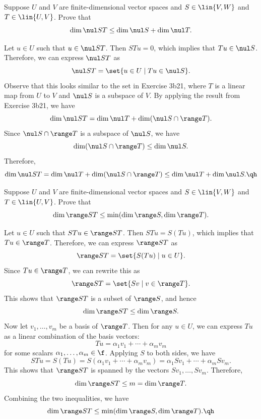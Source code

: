 \begin{exercise}[3b22]
    Suppose $U$ and $V$ are finite-dimensional vector spaces and $S \in \lin{V, W}$ and $T \in \lin{U, V}$. Prove that
    \[\dim \nul ST \leq \dim \nul S + \dim \nul T.\]
\end{exercise}

\begin{sol}
    Let $u \in U$ such that $u \in \nul ST$. Then $STu = 0$, which implies that $Tu \in \nul S$. Therefore, we can express $\nul ST$ as
    \[\nul ST = \set{u \in U \mid Tu \in \nul S}.\]
    Observe that this looks similar to the set in Exercise 3b21, where $T$ is a linear map from $U$ to $V$ and $\nul S$ is a subspace of $V$. By applying the result from Exercise 3b21, we have
    \[\dim \nul ST = \dim \nul T + \dim(\nul S \cap \range T).\]
    Since $\nul S \cap \range T$ is a subspace of $\nul S$, we have
    \[\dim(\nul S \cap \range T) \leq \dim \nul S.\]
    Therefore,
    \[\dim \nul ST = \dim \nul T + \dim(\nul S \cap \range T) \leq \dim \nul T + \dim \nul S. \qh\]
\end{sol}

\begin{exercise}[3b23]
    Suppose $U$ and $V$ are finite-dimensional vector spaces and $S \in \lin{V, W}$ and $T \in \lin{U, V}$. Prove that
    \[\dim \range ST \leq \min(\dim \range S, \dim \range T).\]
\end{exercise}

\begin{sol}
    Let $u \in U$ such that $STu \in \range ST$. Then $STu = S(Tu)$, which implies that $Tu \in \range T$. Therefore, we can express $\range ST$ as
    \[\range ST = \set{S(Tu) \mid u \in U}.\]
    Since $Tu \in \range T$, we can rewrite this as
    \[\range ST = \set{Sv \mid v \in \range T}.\]
    This shows that $\range ST$ is a subset of $\range S$, and hence
    \[\dim \range ST \leq \dim \range S.\]
    Now let $v_1, \ldots, v_m$ be a basis of $\range T$. Then for any $u \in U$, we can express $Tu$ as a linear combination of the basis vectors:
    \[Tu = \alpha_1 v_1 + \cdots + \alpha_m v_m\]
    for some scalars $\alpha_1, \ldots, \alpha_m \in \f$. Applying $S$ to both sides, we have
    \[STu = S(Tu) = S(\alpha_1 v_1 + \cdots + \alpha_m v_m) = \alpha_1 Sv_1 + \cdots + \alpha_m Sv_m.\]
    This shows that $\range ST$ is spanned by the vectors $Sv_1, \ldots, Sv_m$. Therefore,
    \[\dim \range ST \leq m = \dim \range T.\]
    Combining the two inequalities, we have
    \[\dim \range ST \leq \min(\dim \range S, \dim \range T). \qh\]
\end{sol}

